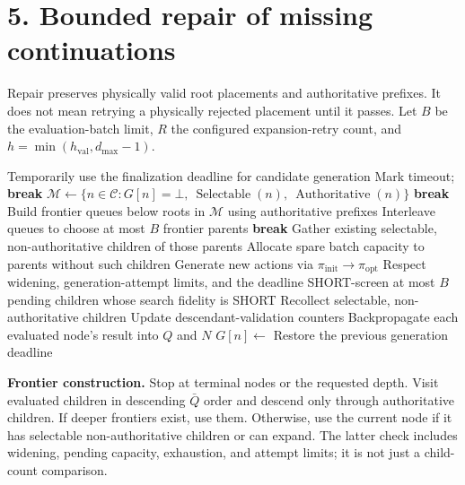\documentclass[11pt]{article}
\newcommand{\none}{\bot}
\newcommand{\MeanRoot}{\bar Q}
\newcommand{\Auth}{\operatorname{Authoritative}}
\newcommand{\Sel}{\operatorname{Selectable}}
\begin{document}
\newpage
\section*{5. Bounded repair of missing continuations}
Repair preserves physically valid root placements and authoritative prefixes.
It does not mean retrying a physically rejected placement until it passes.
Let $B$ be the evaluation-batch limit, $R$ the configured expansion-retry count,
and $h=\min(h_{\mathrm{val}},d_{\max}-1)$.

\begin{algorithm}[H]
\caption{RepairMissingPaths: generate and validate replacement continuations}
\small
\begin{algorithmic}[1]
    \State \Return
  \EndIf
   \State \Return \EndIf
  \State Temporarily use the finalization deadline for candidate generation
     \State Mark timeout; \textbf{break} \EndIf
    \State $\mathcal M\gets\{n\in\mathcal C:G[n]=\none,\ \Sel(n),\ \Auth(n)\}$
     \State \textbf{break} \EndIf
    \State Build frontier queues below roots in $\mathcal M$ using authoritative prefixes
    \State Interleave queues to choose at most $B$ frontier parents
     \State \textbf{break} \EndIf
    \State Gather existing selectable, non-authoritative children of those parents
    \State Allocate spare batch capacity to parents without such children
    \State Generate new actions via $\pi_{\mathrm{init}}\to\pi_{\mathrm{opt}}$
    \State Respect widening, generation-attempt limits, and the deadline
    \State SHORT-screen at most $B$ pending children whose search fidelity is SHORT
    \State Recollect selectable, non-authoritative children
      \State {}
      \State Update descendant-validation counters
      \State Backpropagate each evaluated node's result into $Q$ and $N$
    \EndFor
      \State $G[n]\gets$ 
    \EndFor
  \EndFor
  \State Restore the previous generation deadline
\EndProcedure
\end{algorithmic}
\end{algorithm}

\textbf{Frontier construction.} Stop at terminal nodes or the requested depth.
Visit evaluated children in descending $\MeanRoot$ order and descend only through
authoritative children. If deeper frontiers exist, use them. Otherwise, use the
current node if it has selectable non-authoritative children or can expand.
The latter check includes widening, pending capacity, exhaustion, and attempt
limits; it is not just a child-count comparison.
\end{document}
